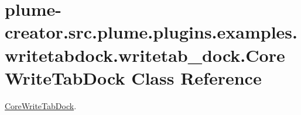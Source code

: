 \hypertarget{classplume-creator_1_1src_1_1plume_1_1plugins_1_1examples_1_1writetabdock_1_1writetab__dock_1_1_core_write_tab_dock}{}\section{plume-\/creator.src.\+plume.\+plugins.\+examples.\+writetabdock.\+writetab\+\_\+dock.\+Core\+Write\+Tab\+Dock Class Reference}
\label{classplume-creator_1_1src_1_1plume_1_1plugins_1_1examples_1_1writetabdock_1_1writetab__dock_1_1_core_write_tab_dock}


\hyperlink{classplume-creator_1_1src_1_1plume_1_1plugins_1_1examples_1_1writetabdock_1_1writetab__dock_1_1_core_write_tab_dock}{Core\+Write\+Tab\+Dock}.  


